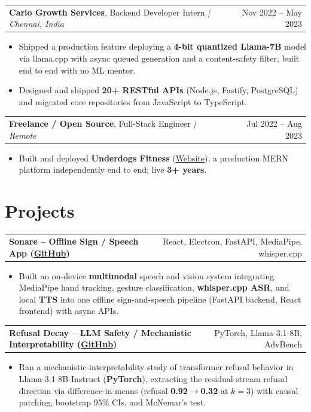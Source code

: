 \documentclass[letterpaper,11pt]{article}
\makeatletter
\newcommand{\expItem}[4]{%
  \vspace{3pt}
  \begin{tabular*}{\textwidth}{@{}l@{\extracolsep{\fill}}r@{}}
    \textbf{#1}, #2 \textit{| #3} & #4 \\
  \end{tabular*}\par\vspace{-2pt}
}
\newcommand{\projItem}[2]{%
  \vspace{6pt}
  \begin{tabular*}{\textwidth}{@{}l@{\extracolsep{\fill}}r@{}}
    \textbf{#1} & #2 \\
  \end{tabular*}\par\vspace{-2pt}
}
\makeatother
\begin{document}
\expItem{Cario Growth Services}{Backend Developer Intern}{Chennai, India}{Nov 2022 -- May 2023}
\begin{itemize}
  \item Shipped a production feature deploying a \textbf{4-bit quantized Llama-7B} model via llama.cpp with async queued generation and a content-safety filter, built end to end with no ML mentor.
  \item Designed and shipped \textbf{20+ RESTful APIs} (Node.js, Fastify, PostgreSQL) and migrated core repositories from JavaScript to TypeScript.
\end{itemize}

\expItem{Freelance / Open Source}{Full-Stack Engineer}{Remote}{Jul 2022 -- Aug 2023}
\begin{itemize}
  \item Built and deployed \textbf{Underdogs Fitness} (\href{https://www.underdogsfitness.in/}{Website}), a production MERN platform independently end to end; live \textbf{3+ years}.
\end{itemize}

\section{Projects}

\projItem{Sonare -- Offline Sign / Speech App {\normalfont\small(\href{https://github.com/Deva-1903/Qualcomm-Sep25-Team-Sonare}{GitHub})}}{React, Electron, FastAPI, MediaPipe, whisper.cpp}
\begin{itemize}
  \item Built an on-device \textbf{multimodal} speech and vision system integrating MediaPipe hand tracking, gesture classification, \textbf{whisper.cpp ASR}, and local \textbf{TTS} into one offline sign-and-speech pipeline (FastAPI backend, React frontend) with async APIs.
\end{itemize}

\projItem{Refusal Decay -- LLM Safety / Mechanistic Interpretability {\normalfont\small(\href{https://github.com/Deva-1903/refusal-decay}{GitHub})}}{PyTorch, Llama-3.1-8B, AdvBench}
\begin{itemize}
  \item Ran a mechanistic-interpretability study of transformer refusal behavior in Llama-3.1-8B-Instruct (\textbf{PyTorch}), extracting the residual-stream refusal direction via difference-in-means (refusal \textbf{0.92$\to$0.32} at $k{=}3$) with causal patching, bootstrap 95\% CIs, and McNemar's test.
\end{itemize}
\end{document}
